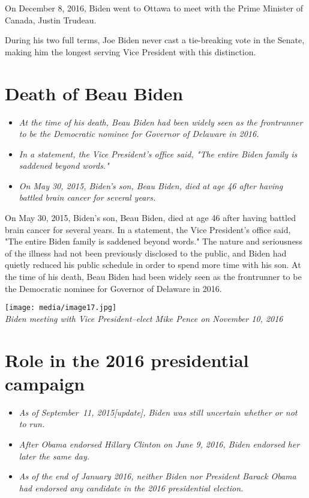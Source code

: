 On December 8, 2016, Biden went to Ottawa to meet with the Prime
Minister of Canada, Justin Trudeau.

During his two full terms, Joe Biden never cast a tie-breaking vote in
the Senate, making him the longest serving Vice President with this
distinction.

\section{Death of Beau Biden}\label{death-of-beau-biden}

\begin{itemize}
\item
  \emph{At the time of his death, Beau Biden had been widely seen as the
  frontrunner to be the Democratic nominee for Governor of Delaware in
  2016.}
\item
  \emph{In a statement, the Vice President's office said, "The entire
  Biden family is saddened beyond words."}
\item
  \emph{On May 30, 2015, Biden's son, Beau Biden, died at age 46 after
  having battled brain cancer for several years.}
\end{itemize}

On May 30, 2015, Biden's son, Beau Biden, died at age 46 after having
battled brain cancer for several years. In a statement, the Vice
President's office said, "The entire Biden family is saddened beyond
words." The nature and seriousness of the illness had not been
previously disclosed to the public, and Biden had quietly reduced his
public schedule in order to spend more time with his son. At the time of
his death, Beau Biden had been widely seen as the frontrunner to be the
Democratic nominee for Governor of Delaware in 2016.

\texttt{[image: media/image17.jpg]}\\
\emph{Biden meeting with Vice President--elect Mike Pence on November
10, 2016}

\section{Role in the 2016 presidential
campaign}\label{role-in-the-2016-presidential-campaign}

\begin{itemize}
\item
  \emph{As of September~11, 2015{[}update{]}, Biden was still uncertain
  whether or not to run.}
\item
  \emph{After Obama endorsed Hillary Clinton on June 9, 2016, Biden
  endorsed her later the same day.}
\item
  \emph{As of the end of January 2016, neither Biden nor President
  Barack Obama had endorsed any candidate in the 2016 presidential
  election.}
\end{itemize}

